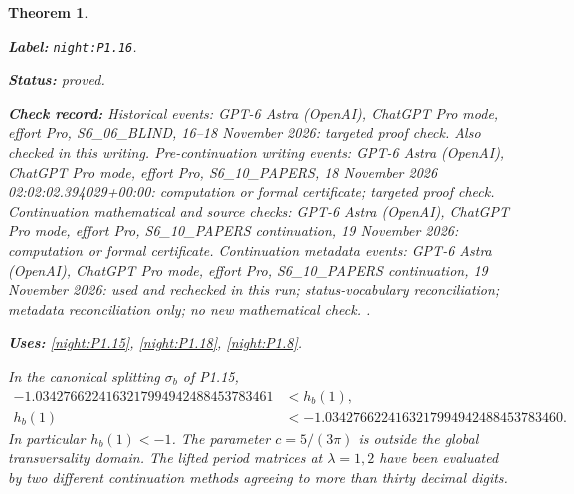 \documentclass[11pt,a4paper]{article}
\newtheorem{theorem}{Theorem}[section]
\theoremstyle{definition}
\newcommand{\StatementRecord}[4]{\par\smallskip\begingroup\upshape\raggedright\noindent\textbf{Label:} \nolinkurl{#1}.\par\noindent\textbf{Status:} #2.\par\noindent\textbf{Check record:} #3.\par\noindent\textbf{Uses:} #4.\par\endgroup\smallskip}
\begin{document}
\begin{theorem}\label{night:P1.16}
\StatementRecord{night:P1.16}{proved}{Historical events: GPT-6 Astra (OpenAI), ChatGPT Pro mode, effort Pro, S6\_06\_BLIND, 16--18 November 2026: targeted proof check. Also checked in this writing. Pre-continuation writing events: GPT-6 Astra (OpenAI), ChatGPT Pro mode, effort Pro, S6\_10\_PAPERS, 18 November 2026 02:02:02.394029+00:00: computation or formal certificate; targeted proof check. Continuation mathematical and source checks: GPT-6 Astra (OpenAI), ChatGPT Pro mode, effort Pro, S6\_10\_PAPERS continuation, 19 November 2026: computation or formal certificate. Continuation metadata events: GPT-6 Astra (OpenAI), ChatGPT Pro mode, effort Pro, S6\_10\_PAPERS continuation, 19 November 2026: used and rechecked in this run; status-vocabulary reconciliation; metadata reconciliation only; no new mathematical check. }{\cref{night:P1.15}, \cref{night:P1.18}, \cref{night:P1.8}}
In the canonical splitting $\sigma_b$ of P1.15,
\[
\begin{aligned}
-1.0342766224163217994942488453783461&<h_b(1),\\
h_b(1)&<-1.0342766224163217994942488453783460.
\end{aligned}
\]
In particular $h_b(1)<-1$.  The parameter $c=5/(3\pi)$ is outside the
global transversality domain.  The lifted period matrices at
$\lambda=1,2$ have been evaluated by two different continuation methods
agreeing to more than thirty decimal digits.
\end{theorem}
\end{document}
